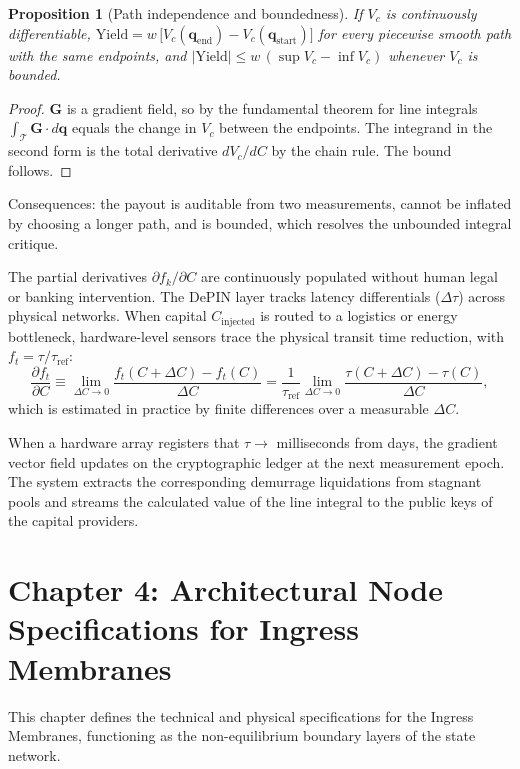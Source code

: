 \documentclass[11pt,a4paper]{article}
\theoremstyle{definition}
\theoremstyle{plain}
\newtheorem{proposition}{Proposition}
\theoremstyle{remark}
\begin{document}
\begin{proposition}[Path independence and boundedness]\label{prop:yield}
If $V_c$ is continuously differentiable, $\mathrm{Yield} = w\,\big[V_c(\mathbf q_{\mathrm{end}}) - V_c(\mathbf q_{\mathrm{start}})\big]$ for every piecewise smooth path with the same endpoints, and $|\mathrm{Yield}| \le w\,(\sup V_c - \inf V_c)$ whenever $V_c$ is bounded.
\end{proposition}
\begin{proof}
$\mathbf G$ is a gradient field, so by the fundamental theorem for line integrals $\int_{\mathcal T}\mathbf G\cdot d\mathbf q$ equals the change in $V_c$ between the endpoints. The integrand in the second form is the total derivative $dV_c/dC$ by the chain rule. The bound follows. \qedhere
\end{proof}

Consequences: the payout is auditable from two measurements, cannot be inflated by choosing a longer path, and is bounded, which resolves the unbounded integral critique.

The partial derivatives $\partial f_k/\partial C$ are continuously populated without human legal or banking intervention. The DePIN layer tracks latency differentials ($\Delta\tau$) across physical networks. When capital $C_{\mathrm{injected}}$ is routed to a logistics or energy bottleneck, hardware-level sensors trace the physical transit time reduction, with $f_t = \tau/\tau_{\mathrm{ref}}$:
\begin{equation}
\frac{\partial f_t}{\partial C} \equiv \lim_{\Delta C \to 0}
\frac{f_t(C + \Delta C) - f_t(C)}{\Delta C}
= \frac{1}{\tau_{\mathrm{ref}}}\lim_{\Delta C \to 0}\frac{\tau(C + \Delta C) - \tau(C)}{\Delta C},
\end{equation}
which is estimated in practice by finite differences over a measurable $\Delta C$.

When a hardware array registers that $\tau \to$ milliseconds from days, the gradient vector field updates on the cryptographic ledger at the next measurement epoch. The system extracts the corresponding demurrage liquidations from stagnant pools and streams the calculated value of the line integral to the public keys of the capital providers.

\clearpage
\clearpage
\section*{Chapter 4: Architectural Node Specifications for Ingress Membranes}
This chapter defines the technical and physical specifications for the Ingress Membranes, functioning as the non-equilibrium boundary layers of the state network.
\end{document}
